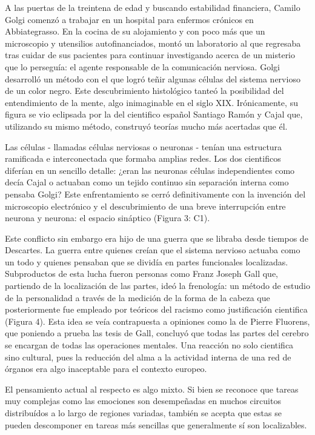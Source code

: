 A las puertas de la treintena de edad y buscando estabilidad financiera, Camilo Golgi comenzó a trabajar en un hospital para enfermos crónicos en Abbiategrasso. En la cocina de su alojamiento y con poco más que un microscopio y utensilios autofinanciados, montó un laboratorio al que regresaba tras cuidar de sus pacientes para continuar investigando acerca de un misterio que lo perseguía: el agente responsable de la comunicación nerviosa. Golgi desarrolló un método con el que logró teñir algunas células del sistema nervioso de un color negro. Este descubrimiento histológico tanteó la posibilidad del entendimiento de la mente, algo inimaginable en el siglo XIX. Irónicamente, su figura se vio eclipsada por la del cientifico español Santiago Ramón y Cajal que, utilizando su mismo método, construyó teorías mucho más acertadas que él.

Las células - llamadas células nerviosas o neuronas - tenían una estructura ramificada e interconectada que formaba amplias redes. Los dos cientificos diferían en un sencillo detalle: ¿eran las neuronas células independientes como decía Cajal o actuaban como un tejido continuo sin separación interna como pensaba Golgi? Este enfrentamiento se cerró definitivamente con la invención del microscopio electrónico y el descubrimiento de una breve interrupción entre neurona y neurona: el espacio sináptico (Figura 3: C1).


Este conflicto sin embargo era hijo de una guerra que se libraba desde tiempos de Descartes. La guerra entre quienes creían que el sistema nervioso actuaba como un todo y quienes pensaban que se dividía en partes funcionales localizadas. Subproductos de esta lucha fueron personas como Franz Joseph Gall que, partiendo de la localización de las partes, ideó la frenología: un método de estudio de la personalidad a través de la medición de la forma de la cabeza que posteriormente fue empleado por teóricos del racismo como justificación cientifica (Figura 4). Esta idea se veía contrapuesta a opiniones como la de Pierre Fluorens, que poniendo a prueba las tesis de Gall, concluyó que todas las partes del cerebro se encargan de todas las operaciones mentales. Una reacción no solo cientifica sino cultural, pues la reducción del alma a la actividad interna de una red de órganos era algo inaceptable para el contexto europeo.


El pensamiento actual al respecto es algo mixto. Si bien se reconoce que tareas muy complejas como las emociones son desempeñadas en muchos circuitos distribuídos a lo largo de regiones variadas, también se acepta que estas se pueden descomponer en tareas más sencillas que generalmente sí son localizables.

